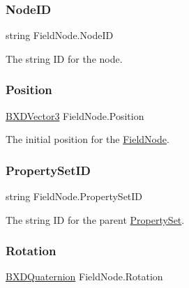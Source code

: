 \mbox{\label{class_field_node_a7d4f3453f91c082b7d5604c6e1581425}} 
\subsubsection{\texorpdfstring{Node\+ID}{NodeID}}
{\footnotesize\ttfamily string Field\+Node.\+Node\+ID}



The string ID for the node. 

\mbox{\label{class_field_node_a884d35ceb35d10ea8643cc7e36be5ff9}} 
\subsubsection{\texorpdfstring{Position}{Position}}
{\footnotesize\ttfamily \hyperlink{class_b_x_d_vector3}{B\+X\+D\+Vector3} Field\+Node.\+Position}



The initial position for the \hyperlink{class_field_node}{Field\+Node}. 

\mbox{\label{class_field_node_ae1bc4426382f512a64980cd28a6f67cc}} 
\subsubsection{\texorpdfstring{Property\+Set\+ID}{PropertySetID}}
{\footnotesize\ttfamily string Field\+Node.\+Property\+Set\+ID}



The string ID for the parent \hyperlink{struct_property_set}{Property\+Set}. 

\mbox{\label{class_field_node_a39d5c7e9a136e334fd53b6e77a9964d4}} 
\subsubsection{\texorpdfstring{Rotation}{Rotation}}
{\footnotesize\ttfamily \hyperlink{class_b_x_d_quaternion}{B\+X\+D\+Quaternion} Field\+Node.\+Rotation}



